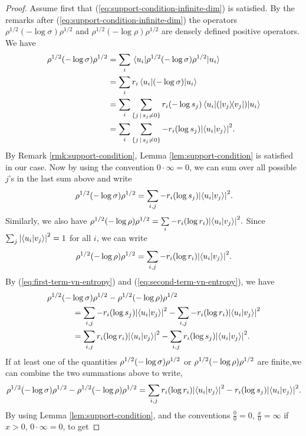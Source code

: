 \documentclass[12pt,a4paper,oneside]{article}
\numberwithin{equation}{section}
\theoremstyle{definition}  %
\theoremstyle{plain}  %
\theoremstyle{remark} %
\let\tr\relax
\DeclareMathOperator{\tr}{Tr}
\begin{document}
 \begin{proof}
Assume first that (\ref{eq:support-condition-infinite-dim}) is satisfied. By the remarks after (\ref{eq:support-condition-infinite-dim}) the operators $\rho^{1/2}(-\log\sigma)\rho^{1/2}$ and $\rho^{1/2}(-\log \rho)\rho^{1/2}$ are densely defined positive operators. We have
\begin{align*}
    \tr \rho^{1/2}(-\log\sigma)\rho^{1/2} &= \sum\limits_{i}\mel{u_i}{\rho^{1/2}(-\log\sigma)\rho^{1/2}}{u_i}\\
    &=\sum\limits_{i}r_i\mel{u_i}{(-\log\sigma)}{u_i}\\
     &=\sum\limits_{i}\sum\limits_{\{j\,|\, s_j\neq 0\}}r_i(-\log s_j)\mel{u_i}{(\ketbra{v_j})}{u_i}\\
      &=\sum\limits_{i}\sum\limits_{\{j\,|\, s_j\neq 0\}}-r_i(\log s_j)\abs{\braket{u_i}{v_j}}^2.
\end{align*}
By Remark \ref{rmk:support-condition}, Lemma \ref{lem:support-condition} is satisfied in our case. Now by using the convention $0\cdot\infty = 0$, we can sum over all possible $j$'s in the last sum above and write  \begin{align}\label{eq:first-term-vn-entropy}
    \tr \rho^{1/2}(-\log\sigma)\rho^{1/2}= \sum\limits_{i,j}-r_i(\log s_j)\abs{\braket{u_i}{v_j}}^2.
\end{align}
Similarly, we also have $\tr \rho^{1/2}(-\log\rho)\rho^{1/2}= \sum\limits_{i}-r_i(\log r_i)\abs{\braket{u_i}{v_j}}^2.$ Since $\sum_j\abs{\braket{u_i}{v_j}}^2 = 1$ for all $i$, we can write
\begin{align}\label{eq:second-term-vn-entropy}
    \tr \rho^{1/2}(-\log\rho)\rho^{1/2}= \sum\limits_{i,j}-r_i(\log r_i)\abs{\braket{u_i}{v_j}}^2.
\end{align}
By (\ref{eq:first-term-vn-entropy}) and (\ref{eq:second-term-vn-entropy}), we have  \begin{align}\label{eq:vn-entropy-formula-before-clubbing the terms}
 & \tr \rho^{1/2}(-\log\sigma)\rho^{1/2}-\tr\rho^{1/2}(-\log\rho)\rho^{1/2}\nonumber\\
 &\phantom{...........}= \sum\limits_{i,j}-r_i(\log s_j)\abs{\braket{u_i}{v_j}}^2 -\sum\limits_{i,j}-r_i(\log r_i)\abs{\braket{u_i}{v_j}}^2\nonumber\\
    &\phantom{...........}=\sum\limits_{i,j} r_i(\log r_i)\abs{\braket{u_i}{v_j}}^2-\sum\limits_{i,j}r_i(\log s_j)\abs{\braket{u_i}{v_j}}^2.\end{align}
    If at least one of  the quantities $\tr \rho^{1/2}(-\log\sigma)\rho^{1/2}$ or $\tr\rho^{1/2}(-\log\rho)\rho^{1/2}$ are  finite,we can combine the two summations above to write,\[\tr \rho^{1/2}(-\log\sigma)\rho^{1/2}-\tr\rho^{1/2}(-\log\rho)\rho^{1/2} = \sum\limits_{i,j} r_i(\log r_i)\abs{\braket{u_i}{v_j}}^2-r_i(\log s_j)\abs{\braket{u_i}{v_j}}^2.\]  By using Lemma \ref{lem:support-condition}, and the conventions $\frac{0}{0}=0$, $\frac{x}{0}=\infty$ if $x>0$, $0\cdot\infty = 0$,   to get  

\end{proof}
\end{document}
